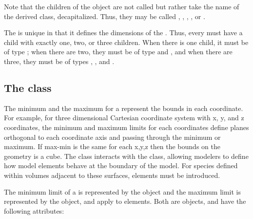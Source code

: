 Note that the children of the \ListOfGeometryDefinitions object are not called  but rather take the name of the derived class, decapitalized.  Thus, they may be called , , , , or .

The \ListOfCoordinateComponents is unique in that it defines the dimensions of the \Geometry.  Thus, every \Geometry must have a child \ListOfCoordinateComponents with exactly one, two, or three children.  When there is one child, it must be of type ; when there are two, they must be of type  and , and when there are three, they must be of types , , and .


\subsection{The  class}
\label{boundary-class}
The minimum and the maximum for a \CoordinateComponent represent the bounds in each coordinate.  For example, for three dimensional Cartesian coordinate system with x, y, and z coordinates, the minimum and maximum limits for each coordinates define planes orthogonal to each coordinate axis and passing through the minimum or maximum.  If max-min is the same for each x,y,z then the bounds on the geometry is a cube.  The \Boundary class interacts with the \BoundaryCondition class, allowing modelers to define how model elements behave at the boundary of the model.  For species defined within volumes adjacent to these surfaces, \BoundaryCondition elements must be introduced.


The minimum limit of a \CoordinateComponent is represented by the  object and the maximum limit is represented by the  object, and apply to \CoordinateComponent elements.
Both are \Boundary objects, and have the following attributes:


